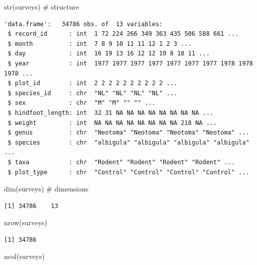 \documentclass[
  letterpaper,
  DIV=11,
  numbers=noendperiod]{scrreprt}
\newenvironment{Shaded}{\begin{snugshade}}{\end{snugshade}}
\newcommand{\CommentTok}[1]{\textcolor[rgb]{0.37,0.37,0.37}{#1}}
\newcommand{\FunctionTok}[1]{\textcolor[rgb]{0.28,0.35,0.67}{#1}}
\newcommand{\NormalTok}[1]{\textcolor[rgb]{0.00,0.23,0.31}{#1}}
\begin{document}
\begin{Shaded}
\begin{Highlighting}[]
\FunctionTok{str}\NormalTok{(surveys) }\CommentTok{\# structure}
\end{Highlighting}
\end{Shaded}

\begin{verbatim}
'data.frame':   34786 obs. of  13 variables:
 $ record_id      : int  1 72 224 266 349 363 435 506 588 661 ...
 $ month          : int  7 8 9 10 11 11 12 1 2 3 ...
 $ day            : int  16 19 13 16 12 12 10 8 18 11 ...
 $ year           : int  1977 1977 1977 1977 1977 1977 1977 1978 1978 1978 ...
 $ plot_id        : int  2 2 2 2 2 2 2 2 2 2 ...
 $ species_id     : chr  "NL" "NL" "NL" "NL" ...
 $ sex            : chr  "M" "M" "" "" ...
 $ hindfoot_length: int  32 31 NA NA NA NA NA NA NA NA ...
 $ weight         : int  NA NA NA NA NA NA NA NA 218 NA ...
 $ genus          : chr  "Neotoma" "Neotoma" "Neotoma" "Neotoma" ...
 $ species        : chr  "albigula" "albigula" "albigula" "albigula" ...
 $ taxa           : chr  "Rodent" "Rodent" "Rodent" "Rodent" ...
 $ plot_type      : chr  "Control" "Control" "Control" "Control" ...
\end{verbatim}

\begin{Shaded}
\begin{Highlighting}[]
\FunctionTok{dim}\NormalTok{(surveys) }\CommentTok{\# dimensions}
\end{Highlighting}
\end{Shaded}

\begin{verbatim}
[1] 34786    13
\end{verbatim}

\begin{Shaded}
\begin{Highlighting}[]
\FunctionTok{nrow}\NormalTok{(surveys)}
\end{Highlighting}
\end{Shaded}

\begin{verbatim}
[1] 34786
\end{verbatim}

\begin{Shaded}
\begin{Highlighting}[]
\FunctionTok{ncol}\NormalTok{(surveys)}
\end{Highlighting}
\end{Shaded}
\end{document}
